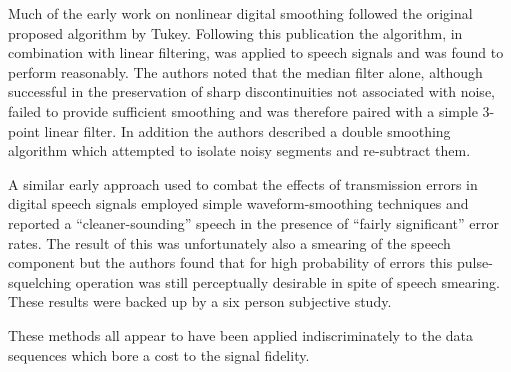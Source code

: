 Much of the early work on nonlinear digital smoothing followed the original proposed algorithm by Tukey\cite{Tukey1974}. Following this publication the algorithm, in combination with linear filtering, was applied to speech signals and was found to perform reasonably\cite{Rabiner1975}. The authors noted that the median filter alone, although successful in the preservation of sharp discontinuities not associated with noise, failed to provide sufficient smoothing and was therefore paired with a simple 3-point linear filter. In addition the authors described a double smoothing algorithm which attempted to isolate noisy segments and re-subtract them.


%
%
A similar early approach used to combat the effects of transmission errors in digital speech signals employed simple waveform-smoothing techniques and reported a ``cleaner-sounding'' speech in the presence of ``fairly significant'' error rates\cite{Jayant1976}. The result of this was unfortunately also a smearing of the speech component but the authors found that for high probability of errors this pulse-squelching operation was still perceptually desirable in spite of speech smearing. These results were backed up by a six person subjective study.

\cite{Rabiner1975}
%
%

These methods all appear to have been applied indiscriminately to the data sequences which bore a cost to the signal fidelity.


